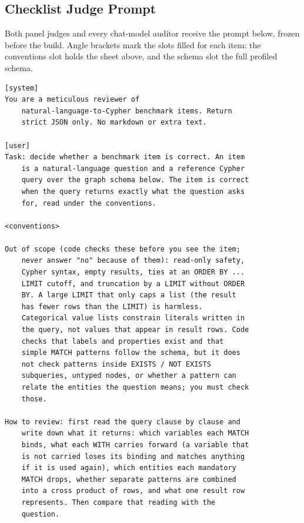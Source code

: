 \subsection{Checklist Judge Prompt}
\label{app:judgeprompt}
Both panel judges and every chat-model auditor receive the prompt below, frozen before the build. Angle brackets mark the slots filled for each item: the conventions slot holds the sheet above, and the schema slot the full profiled schema.
\par\smallskip
\begingroup
\fontsize{6.3}{7.3}\selectfont
\begin{verbatim}
[system]
You are a meticulous reviewer of
    natural-language-to-Cypher benchmark items. Return
    strict JSON only. No markdown or extra text.

[user]
Task: decide whether a benchmark item is correct. An item
    is a natural-language question and a reference Cypher
    query over the graph schema below. The item is correct
    when the query returns exactly what the question asks
    for, read under the conventions.

<conventions>

Out of scope (code checks these before you see the item;
    never answer "no" because of them): read-only safety,
    Cypher syntax, empty results, ties at an ORDER BY ...
    LIMIT cutoff, and truncation by a LIMIT without ORDER
    BY. A large LIMIT that only caps a list (the result
    has fewer rows than the LIMIT) is harmless.
    Categorical value lists constrain literals written in
    the query, not values that appear in result rows. Code
    checks that labels and properties exist and that
    simple MATCH patterns follow the schema, but it does
    not check patterns inside EXISTS / NOT EXISTS
    subqueries, untyped nodes, or whether a pattern can
    relate the entities the question means; you must check
    those.

How to review: first read the query clause by clause and
    write down what it returns: which variables each MATCH
    binds, what each WITH carries forward (a variable that
    is not carried loses its binding and matches anything
    if it is used again), which entities each mandatory
    MATCH drops, whether separate patterns are combined
    into a cross product of rows, and what one result row
    represents. Then compare that reading with the
    question.


\end{verbatim}
